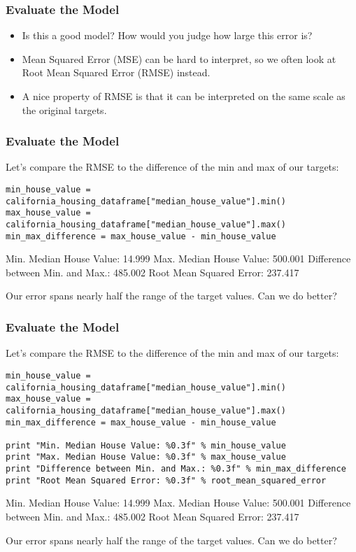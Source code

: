 \begin{frame}[fragile]\frametitle{Evaluate the Model}
\begin{itemize}
\item Is this a good model? How would you judge how large this error is?
\item Mean Squared Error (MSE) can be hard to interpret, so we often look at Root Mean Squared Error (RMSE) instead. 
\item A nice property of RMSE is that it can be interpreted on the same scale as the original targets.
\end{itemize}
\end{frame}

\begin{frame}[fragile]\frametitle{Evaluate the Model}
Let's compare the RMSE to the difference of the min and max of our targets:
\begin{lstlisting}
min_house_value = california_housing_dataframe["median_house_value"].min()
max_house_value = california_housing_dataframe["median_house_value"].max()
min_max_difference = max_house_value - min_house_value

\end{lstlisting}
Min. Median House Value: 14.999
Max. Median House Value: 500.001
Difference between Min. and Max.: 485.002
Root Mean Squared Error: 237.417

Our error spans nearly half the range of the target values. Can we do better?
\end{frame}

\begin{frame}[fragile]\frametitle{Evaluate the Model}
Let's compare the RMSE to the difference of the min and max of our targets:
\begin{lstlisting}
min_house_value = california_housing_dataframe["median_house_value"].min()
max_house_value = california_housing_dataframe["median_house_value"].max()
min_max_difference = max_house_value - min_house_value

print "Min. Median House Value: %0.3f" % min_house_value
print "Max. Median House Value: %0.3f" % max_house_value
print "Difference between Min. and Max.: %0.3f" % min_max_difference
print "Root Mean Squared Error: %0.3f" % root_mean_squared_error
\end{lstlisting}
Min. Median House Value: 14.999
Max. Median House Value: 500.001
Difference between Min. and Max.: 485.002
Root Mean Squared Error: 237.417

Our error spans nearly half the range of the target values. Can we do better?
\end{frame}

